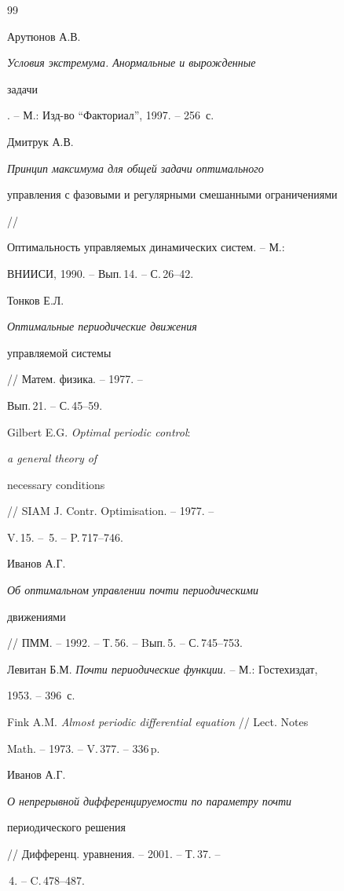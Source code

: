 \begin{thebibliography}{99}







Арутюнов А.В. {\em Условия экстремума. Анормальные и вырожденные


задачи}. -- М.: Изд-во ``Факториал'', 1997. -- 256~с.




Дмитрук А.В. {\em Принцип максимума для общей задачи оптимального


управления с фазовыми и регулярными смешанными ограничениями} //


Оптимальность управляемых динамических систем. -- М.:


ВНИИСИ, 1990. -- Вып.\,14. -- С.\,26--42.




Тонков Е.Л. {\em Оптимальные периодические движения


управляемой системы} // Матем. физика. -- 1977. --


Вып.\,21. -- С.\,45--59.




Gilbert E.G. {\em Optimal periodic control\/}: {\em a general theory of


necessary conditions} // SIAM J. Contr. Optimisation. -- 1977. --


V.\,15. -- \No\,5. -- P.\,717--746.




Иванов А.Г. {\em Об оптимальном управлении почти периодическими


движениями} // ПММ. -- 1992. -- Т.\,56. -- Bып.\,5. -- С.\,745--753.




Левитан Б.М. {\em Почти периодические функции}. -- М.: Гостехиздат,


1953. -- 396~с.




Fink A.M. {\em Almost periodic differential equation} // Lect. Notes


Math. -- 1973. -- V.\,377. -- 336\,p.




Иванов А.Г. {\em О непрерывной дифференцируемости по параметру почти


периодического решения} // Дифференц. уравнения. -- 2001. -- Т.\,37. --


\No\,4. -- C.\,478--487.



\end{thebibliography}
